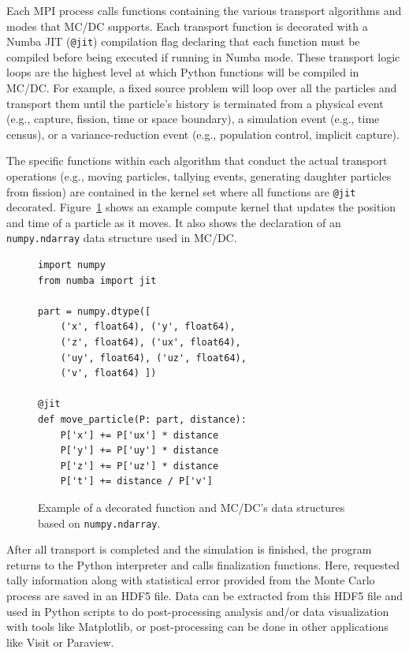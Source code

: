 Each MPI process calls functions containing the various transport algorithms and modes that MC/DC supports.
Each transport function is decorated with a Numba JIT (\texttt{@jit}) compilation flag declaring that each function must be compiled before being executed if running in Numba mode.
These transport logic loops are the highest level at which Python functions will be compiled in MC/DC.
For example, a fixed source problem will loop over all the particles and transport them until the particle's history is terminated from a physical event (e.g., capture, fission, time or space boundary), a simulation event (e.g., time census), or a variance-reduction event (e.g., population control, implicit capture).

The specific functions within each algorithm that conduct the actual transport operations (e.g., moving particles, tallying events, generating daughter particles from fission) are contained in the kernel set where all functions are \texttt{@jit} decorated.
Figure~\ref{fig:jitfunctions} shows an example compute kernel that updates the position and time of a particle as it moves.
It also shows the declaration of an \texttt{numpy.ndarray} data structure used in MC/DC.

\begin{figure}
\begin{verbatim}
import numpy
from numba import jit

part = numpy.dtype([
    ('x', float64), ('y', float64),
    ('z', float64), ('ux', float64),
    ('uy', float64), ('uz', float64),
    ('v', float64) ])

@jit
def move_particle(P: part, distance):
    P['x'] += P['ux'] * distance
    P['y'] += P['uy'] * distance
    P['z'] += P['uz'] * distance
    P['t'] += distance / P['v']
\end{verbatim}
\caption{Example of a decorated function and MC/DC's data structures based on \texttt{numpy.ndarray}.}
\label{fig:jitfunctions}
\end{figure}

After all transport is completed and the simulation is finished, the program returns to the Python interpreter and calls finalization functions.
Here, requested tally information along with statistical error provided from the Monte Carlo process are saved in an HDF5 file.
Data can be extracted from this HDF5 file and used in Python scripts to do post-processing analysis and/or data visualization with tools like Matplotlib, or post-processing can be done in other applications like Visit or Paraview.

